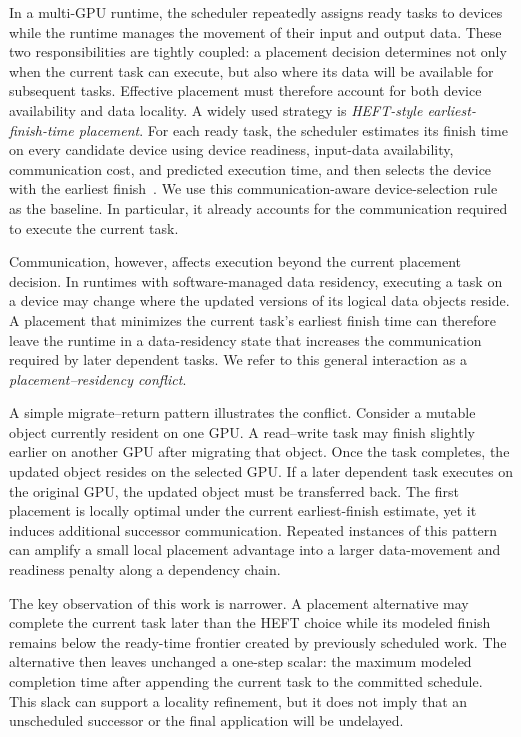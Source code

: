 \documentclass[sigconf]{acmart}
\begin{document}
In a multi-GPU runtime, the scheduler repeatedly assigns ready tasks to devices while the runtime manages the movement of their input and output data. These two responsibilities are tightly coupled: a placement decision determines not only when the current task can execute, but also where its data will be available for subsequent tasks. Effective placement must therefore account for both device availability and data locality. A widely used strategy is \emph{HEFT-style earliest-finish-time placement}. For each ready task, the scheduler estimates its finish time on every candidate device using device readiness, input-data availability, communication cost, and predicted execution time, and then selects the device with the earliest finish~\citep{topcuoglu2002heft}. We use this communication-aware device-selection rule as the baseline. In particular, it already accounts for the communication required to execute the current task.

Communication, however, affects execution beyond the current placement decision. In runtimes with software-managed data residency, executing a task on a device may change where the updated versions of its logical data objects reside. A placement that minimizes the current task's earliest finish time can therefore leave the runtime in a data-residency state that increases the communication required by later dependent tasks. We refer to this general interaction as a \emph{placement--residency conflict}.

A simple migrate--return pattern illustrates the conflict. Consider a mutable object currently resident on one GPU. A read--write task may finish slightly earlier on another GPU after migrating that object. Once the task completes, the updated object resides on the selected GPU. If a later dependent task executes on the original GPU, the updated object must be transferred back. The first placement is locally optimal under the current earliest-finish estimate, yet it induces additional successor communication. Repeated instances of this pattern can amplify a small local placement advantage into a larger data-movement and readiness penalty along a dependency chain.

The key observation of this work is narrower. A placement alternative may complete the current task later than the HEFT choice while its modeled finish remains below the ready-time frontier created by previously scheduled work. The alternative then leaves unchanged a one-step scalar: the maximum modeled completion time after appending the current task to the committed schedule. This slack can support a locality refinement, but it does not imply that an unscheduled successor or the final application will be undelayed.
\end{document}
